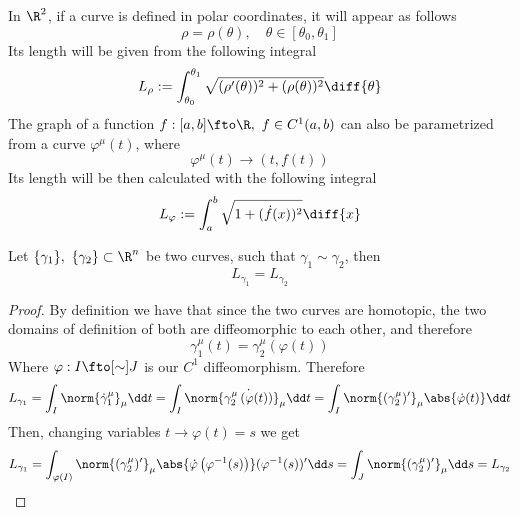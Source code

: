 \documentclass[../mmf.tex]{subfiles}
\begin{document}
\begin{rmk}
	In $\R^2$, if a curve is defined in polar coordinates, it will appear as follows
	\begin{equation}
		\rho=\rho(\theta),\quad\theta\in[\theta_0,\theta_1]
		\label{eq:polarcurve}
	\end{equation}
	Its length will be given from the following integral
	\begin{equation}
		L_\rho:=\int_{\theta_0}^{\theta_1}\sqrt{(\rho'(\theta))^2+(\rho(\theta))^2}\diff{\theta}
		\label{eq:polarcurvelength}
	\end{equation}
	The graph of a function $f:[a,b]\fto\R,\ f\in C^1(a,b)$ can also be parametrized from a curve $\varphi^\mu(t)$, where
	\begin{equation}
		\varphi^\mu(t)\to(t,f(t))
		\label{eq:1dfgraph}
	\end{equation}
	Its length will be then calculated with the following integral
	\begin{equation}
		L_\varphi:=\int_{a}^{b}\sqrt{1+(\dot{f}(x))^2}\diff{x}
		\label{eq:1dfgraphlength}
	\end{equation}
\end{rmk}
\begin{thm}
	Let $\{\gamma_1\},\ \{\gamma_2\}\subset\R^n$ be two curves, such that $\gamma_1\sim\gamma_2$, then
	\begin{equation*}
		L_{\gamma_1}=L_{\gamma_2}
	\end{equation*}
\end{thm}
\begin{proof}
	By definition we have that since the two curves are homotopic, the two domains of definition of both are diffeomorphic to each other, and therefore
	\begin{equation}
		\gamma_1^\mu(t)=\gamma_2^\mu\left(\varphi(t)\right)
		\label{eq:diffeomorph}
	\end{equation}
	Where $\varphi:I\fto[\sim]J$ is our $C^1$ diffeomorphism. Therefore
	\begin{equation*}
		L_{\gamma_1}=\int_{I}^{}\norm{\dot{\gamma}_1^\mu}_\mu\dd t=\int_{I}\norm{\dot{\gamma_2^\mu\left( \varphi(t) \right)}}_\mu\dd t=\int_{I}^{}\norm{(\gamma_2^\mu)'}_\mu\abs{\dot{\varphi}(t)}\dd t
	\end{equation*}
	Then, changing variables $t\to\varphi(t)=s$ we get
	\begin{equation*}
		L_{\gamma_1}=\int_{\varphi(I)}^{}\norm{(\gamma_2^\mu)'}_\mu\abs{\dot{\varphi}\left( \varphi^{-1}(s) \right)}(\varphi^{-1}(s))'\dd s=\int_{J}^{}\norm{(\gamma_2^\mu)'}_\mu\dd s=L_{\gamma_2}
	\end{equation*}
\end{proof}
\end{document}
